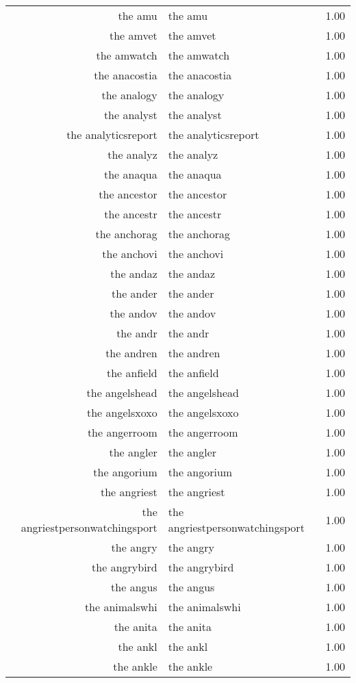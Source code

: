 \begin{table}[ht]
\begin{tabular}{rlr}
  the amu & the amu & 1.00 \\ 
  the amvet & the amvet & 1.00 \\ 
  the amwatch & the amwatch & 1.00 \\ 
  the anacostia & the anacostia & 1.00 \\ 
  the analogy & the analogy & 1.00 \\ 
  the analyst & the analyst & 1.00 \\ 
  the analyticsreport & the analyticsreport & 1.00 \\ 
  the analyz & the analyz & 1.00 \\ 
  the anaqua & the anaqua & 1.00 \\ 
  the ancestor & the ancestor & 1.00 \\ 
  the ancestr & the ancestr & 1.00 \\ 
  the anchorag & the anchorag & 1.00 \\ 
  the anchovi & the anchovi & 1.00 \\ 
  the andaz & the andaz & 1.00 \\ 
  the ander & the ander & 1.00 \\ 
  the andov & the andov & 1.00 \\ 
  the andr & the andr & 1.00 \\ 
  the andren & the andren & 1.00 \\ 
  the anfield & the anfield & 1.00 \\ 
  the angelshead & the angelshead & 1.00 \\ 
  the angelsxoxo & the angelsxoxo & 1.00 \\ 
  the angerroom & the angerroom & 1.00 \\ 
  the angler & the angler & 1.00 \\ 
  the angorium & the angorium & 1.00 \\ 
  the angriest & the angriest & 1.00 \\ 
  the angriestpersonwatchingsport & the angriestpersonwatchingsport & 1.00 \\ 
  the angry & the angry & 1.00 \\ 
  the angrybird & the angrybird & 1.00 \\ 
  the angus & the angus & 1.00 \\ 
  the animalswhi & the animalswhi & 1.00 \\ 
  the anita & the anita & 1.00 \\ 
  the ankl & the ankl & 1.00 \\ 
  the ankle & the ankle & 1.00 \\ 

\end{tabular}
\end{table}
